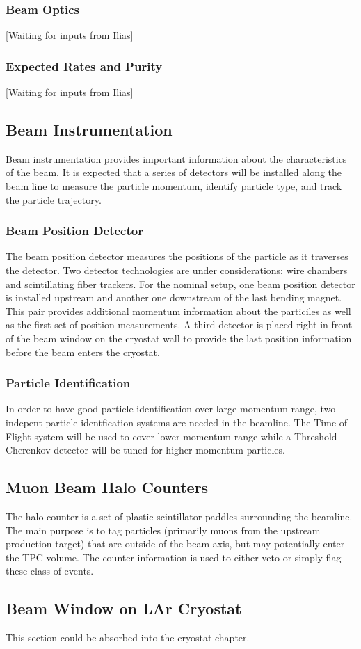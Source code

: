 \subsubsection{Beam Optics}
[Waiting for inputs from Ilias]

\subsubsection{Expected Rates and Purity}
[Waiting for inputs from Ilias]

\subsection{Beam Instrumentation}
Beam instrumentation provides important information about the characteristics of the beam. It is expected that a series of detectors will be installed along the beam line to measure the particle momentum, identify particle type, and track the particle trajectory.

\subsubsection{Beam Position Detector}
The beam position detector measures the positions of the particle as it traverses the detector. Two detector technologies are under considerations: wire chambers and scintillating fiber trackers. For the nominal setup, one beam position detector is installed upstream and another one downstream of the last bending magnet. This pair provides additional momentum information about the particiles as well as the first set of position measurements. A third detector is placed right in front of the beam window on the cryostat wall to provide the last position information before the beam enters the cryostat.

\subsubsection{Particle Identification}
In order to have good particle identification over large momentum range, two indepent particle identfication systems are needed in the beamline. The Time-of-Flight system will be used to cover lower momentum range while a Threshold Cherenkov detector will be tuned for higher momentum particles.

\subsection{Muon Beam Halo Counters}
The halo counter is a set of plastic scintillator paddles surrounding the beamline. The main purpose is to tag particles (primarily muons from the upstream production target) that are outside of the beam axis, but may potentially enter the TPC volume. The counter information is used to either veto or simply flag these class of events.

\subsection{Beam Window on LAr Cryostat}
This section could be absorbed into the cryostat chapter.
